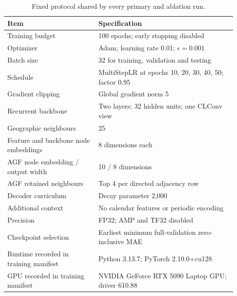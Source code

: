 \documentclass[10pt,a4paper]{article}
\begin{document}
\begin{table}[H]\centering\small\setlength{\tabcolsep}{5pt}\setlength{\parskip}{0pt}

\caption{Fixed protocol shared by every primary and ablation run.}\label{tab:protocol}

\begin{tabular}{p{0.37\linewidth}p{0.56\linewidth}}

\toprule
Item & Specification \\
\midrule

Training budget & 100 epochs; early stopping disabled \\

Optimizer & Adam; learning rate 0.01; $\epsilon=0.001$ \\

Batch size & 32 for training, validation and testing \\

Schedule & MultiStepLR at epochs 10, 20, 30, 40, 50; factor 0.95 \\

Gradient clipping & Global gradient norm 5 \\

Recurrent backbone & Two layers; 32 hidden units; one CLConv view \\

Geographic neighbours & 25 \\

Feature and backbone node embeddings & 8 dimensions each \\

AGF node embedding / output width & 10 / 8 dimensions \\

AGF retained neighbours & Top 4 per directed adjacency row \\

Decoder curriculum & Decay parameter 2,000 \\

Additional context & No calendar features or periodic encoding \\

Precision & FP32; AMP and TF32 disabled \\

Checkpoint selection & Earliest minimum full-validation zero-inclusive MAE \\

Runtime recorded in training manifest & Python 3.13.7; PyTorch 2.10.0+cu128 \\

GPU recorded in training manifest & NVIDIA GeForce RTX 5090 Laptop GPU; driver 610.88 \\

\bottomrule\end{tabular}\end{table}
\end{document}
